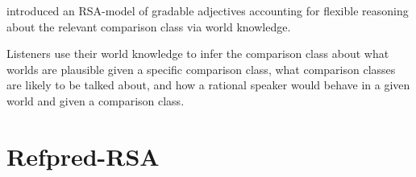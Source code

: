 
\textcite{tessler2017warm} introduced an RSA-model of gradable adjectives accounting for flexible reasoning about the relevant comparison class via world knowledge.

Listeners use their world knowledge to infer the comparison class about what worlds are plausible given a specific comparison class, what comparison classes are likely to be talked about, and how a rational speaker would behave in a given world and given a comparison class. 


\section{Refpred-RSA}
